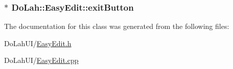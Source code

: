 \subsubsection[{exit\+Button}]{$\ast$ Do\+Lah\+::\+Easy\+Edit\+::exit\+Button}\label{class_do_lah_1_1_easy_edit_ae92382bcf128f607904cc76dcdca07fa}


The documentation for this class was generated from the following files\+:\begin{DoxyCompactItemize}
\item 
Do\+Lah\+U\+I/\hyperlink{_easy_edit_8h}{Easy\+Edit.\+h}\item 
Do\+Lah\+U\+I/\hyperlink{_easy_edit_8cpp}{Easy\+Edit.\+cpp}\end{DoxyCompactItemize}
